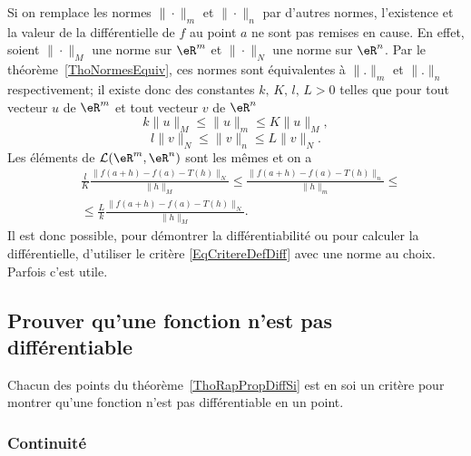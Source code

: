 \begin{remark}
	Si on remplace les normes $\|\cdot\|_m$  et $\|\cdot\|_n$ par d'autres normes, l'existence et la valeur de la différentielle de $f$ au point $a$ ne sont pas remises en cause. En effet, soient  $\|\cdot\|_M$  une norme sur $\eR^m$ et $\|\cdot\|_N$ une norme sur $\eR^n$. Par le théorème~\ref{ThoNormesEquiv}, ces normes sont équivalentes à $\| . \|_m$ et $\| . \|_n$ respectivement; il existe donc des constantes $k,\, K,\, l,\,L >0$ telles que  pour tout vecteur $u$ de $\eR^m$ et tout vecteur $v$ de $\eR^n$
\[
k\|u\|_M\leq \|u\|_m\leq K\|u\|_M,
\]
\[
l\|v\|_N\leq \|v\|_n\leq L\|v\|_N.
\]
Les éléments de $\mathcal{L}(\eR^m, \eR^n)$ sont les mêmes et on a
\begin{equation}
  \begin{aligned}
 & \frac{l}{K}  \frac{\|f(a+h)-f(a)-T(h)\|_N}{\|h\|_M}\leq \frac{\|f(a+h)-f(a)-T(h)\|_n}{\|h\|_m}\leq\\
&\leq\frac{L}{k} \frac{\|f(a+h)-f(a)-T(h)\|_N}{\|h\|_M}.
  \end{aligned}
\end{equation}
Il est donc possible, pour démontrer la différentiabilité ou pour calculer la différentielle, d'utiliser le critère \eqref{EqCritereDefDiff} avec une norme au choix. Parfois c'est utile.
\end{remark}

                    \subsection{Prouver qu'une fonction n'est pas différentiable}

Chacun des points du théorème~\ref{ThoRapPropDiffSi} est en soi un critère pour montrer qu'une fonction n'est pas différentiable en un point.

                    \subsubsection{Continuité}


